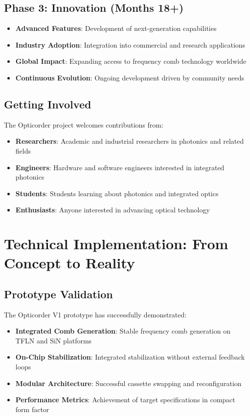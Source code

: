 \documentclass[11pt,a4paper]{article}
\begin{document}
\subsection{Phase 3: Innovation (Months 18+)}
\begin{itemize}
\item \textbf{Advanced Features}: Development of next-generation capabilities
\item \textbf{Industry Adoption}: Integration into commercial and research applications
\item \textbf{Global Impact}: Expanding access to frequency comb technology worldwide
\item \textbf{Continuous Evolution}: Ongoing development driven by community needs
\end{itemize}

\subsection{Getting Involved}
The Opticorder project welcomes contributions from:
\begin{itemize}
\item \textbf{Researchers}: Academic and industrial researchers in photonics and related fields
\item \textbf{Engineers}: Hardware and software engineers interested in integrated photonics
\item \textbf{Students}: Students learning about photonics and integrated optics
\item \textbf{Enthusiasts}: Anyone interested in advancing optical technology
\end{itemize}

\section{Technical Implementation: From Concept to Reality}

\subsection{Prototype Validation}
The Opticorder V1 prototype has successfully demonstrated:
\begin{itemize}
\item \textbf{Integrated Comb Generation}: Stable frequency comb generation on TFLN and SiN platforms
\item \textbf{On-Chip Stabilization}: Integrated stabilization without external feedback loops
\item \textbf{Modular Architecture}: Successful cassette swapping and reconfiguration
\item \textbf{Performance Metrics}: Achievement of target specifications in compact form factor
\end{itemize}
\end{document}
